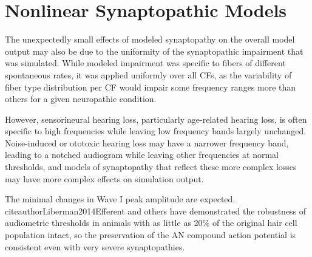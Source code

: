 \section{Nonlinear Synaptopathic Models} %
\label{sec:nonlinear_synaptopathic_models}
The unexpectedly small effects of modeled synaptopathy on the overall model output may also be due to the uniformity of the synaptopathic impairment that was simulated.  While modeled impairment was specific to fibers of different spontaneous rates, it was applied uniformly over all CFs, as the variability of fiber type distribution per CF would impair some frequency ranges more than others for a given neuropathic condition. 

However, sensorineural hearing loss, particularly age-related hearing loss, is often specific to high frequencies while leaving low frequency bands largely unchanged.   Noise-induced or ototoxic hearing loss may have a narrower frequency band, leading to a notched audiogram while leaving other frequencies at normal thresholds, and models of synaptopathy that reflect these more complex losses may have more complex effects on simulation output.

The minimal changes in Wave I peak amplitude are expected.
citeauthor{Liberman2014Efferent} and others have demonstrated the robustness of audiometric thresholds in animals with as little as 20\% of the original hair cell population intact, so the preservation of the AN compound action potential is consistent even with very severe synaptopathies.

